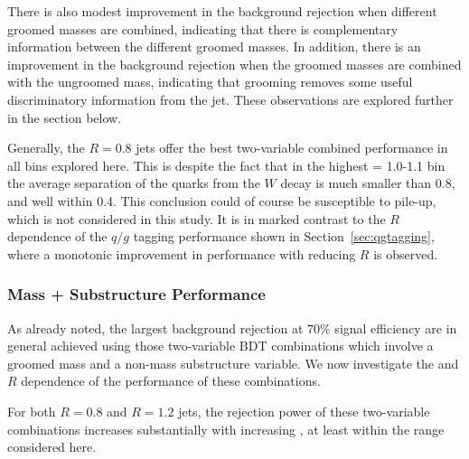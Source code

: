 
There is also modest improvement in
the background rejection when different groomed masses are combined,
 indicating that there is complementary information between the
different groomed masses. In addition, there is an improvement in the
background rejection when the groomed masses are combined with the
ungroomed mass, indicating that grooming removes some useful
discriminatory information from the jet. These observations are
explored further in the section below.

Generally, the $R=0.8$ jets offer the best two-variable
combined performance in all \pt bins explored here. This is despite
the fact that in the highest \pt = 1.0-1.1 \TeV bin the average
separation of the quarks from the $W$ decay is much smaller than 0.8,
and well within 0.4. This conclusion could of course be susceptible to
pile-up, which is not considered in this study. It is in marked
contrast to the $R$ dependence of the $q/g$ tagging performance
shown in Section~\ref{sec:qgtagging}, where a monotonic improvement
in performance with reducing $R$ is observed.

\subsubsection{Mass + Substructure Performance}

As already noted, the largest background rejection at 70\% signal
efficiency are in general achieved using those two-variable BDT combinations
which involve a groomed mass and a non-mass substructure variable. We now investigate
the \pt and $R$ dependence of the performance of these combinations.

For both $R=0.8$ and $R=1.2$ jets, the rejection power of these two-variable
combinations increases substantially with increasing \pt, at least
within the \pt range considered here.


